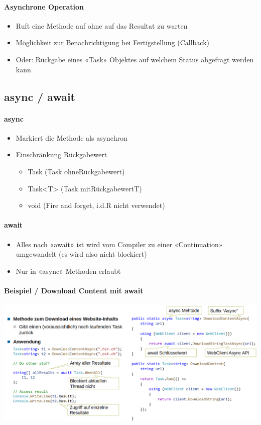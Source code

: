 \documentclass[
a4paper,
oneside,
10pt,
fleqn,
headsepline,
toc=listofnumbered, 
bibliography=totocnumbered]{scrartcl}
\begin{document}
\paragraph{Asynchrone Operation}
\begin{itemize}
    \item Ruft eine Methode auf ohne auf das Resultat zu warten 
    \item Möglichkeit zur Benachrichtigung bei Fertigstellung (Callback) 
    \item Oder: Rückgabe eines «Task» Objektes auf welchem Status abgefragt werden kann 
\end{itemize}
\subsection{async / await}
\paragraph{async}
\begin{itemize}
    \item Markiert die Methode als asynchron
    \item Einschränkung Rückgabewert
    \begin{itemize}
        \item Task (Task ohneRückgabewert) 
        \item Task<T> (Task mitRückgabewertT) 
        \item void (Fire and forget, i.d.R nicht verwendet)
    \end{itemize}
\end{itemize}
\paragraph{await}
\begin{itemize}
    \item Alles nach «await» ist wird vom Compiler zu einer «Continuation» umgewandelt (es wird also nicht blockiert)
    \item Nur in «async» Methoden erlaubt 
\end{itemize}
\clearpage
\paragraph{Beispiel / Download Content mit await} \hfill
\newline


\begin{minipage}[t]{0.95\textwidth}
\centering
\includegraphics[width=0.95\linewidth]{MsTe/images/beispiel-async-await.png}
\end{minipage}
\end{document}
